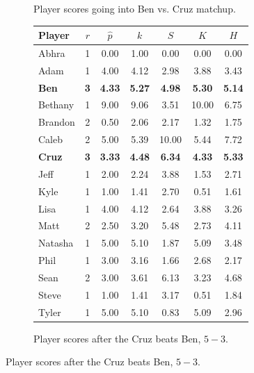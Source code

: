 \documentclass[letterpaper, 10 pt, conference]{ieeeconf}  %
\begin{document}
\begin{figure}[h!b]
\begin{subfigure}[hb]{0.4\textwidth}
\begin{tabular}{lccc|ccc}
                        \bottomrule
                \end{tabular}
                \caption{Player scores going into Ben vs. Cruz matchup.}
        \end{subfigure}
        \begin{subfigure}[hb]{0.4\textwidth}
                \footnotesize
                \centering
                \begin{tabular}{lccc|ccc}
                        \toprule
                        Player	&	$r$	&	$\hat{p}$	&	$k$	&	$S$	&	$K$	&	$H$	\\
                        \midrule													
                        Abhra	&	1	&	0.00	&	1.00	&	0.00	&	0.00	&	0.00	\\
                        Adam	&	1	&	4.00	&	4.12	&	2.98	&	3.88	&	3.43	\\
                        \textbf{Ben}	&	\textbf{3}	&	\textbf{4.33}	&	\textbf{5.27}	&	\textbf{4.98}	&	\textbf{5.30}	&	\textbf{5.14}	\\
                        Bethany	&	1	&	9.00	&	9.06	&	3.51	&	10.00	&	6.75	\\
                        Brandon	&	2	&	0.50	&	2.06	&	2.17	&	1.32	&	1.75	\\
                        Caleb	&	2	&	5.00	&	5.39	&	10.00	&	5.44	&	7.72	\\
                        \textbf{Cruz}	&	\textbf{3}	&	\textbf{3.33}	&	\textbf{4.48}	&	\textbf{6.34}	&	\textbf{4.33}	&	\textbf{5.33}	\\
                        Jeff	&	1	&	2.00	&	2.24	&	3.88	&	1.53	&	2.71	\\
                        Kyle	&	1	&	1.00	&	1.41	&	2.70	&	0.51	&	1.61	\\
                        Lisa	&	1	&	4.00	&	4.12	&	2.64	&	3.88	&	3.26	\\
                        Matt	&	2	&	2.50	&	3.20	&	5.48	&	2.73	&	4.11	\\
                        Natasha	&	1	&	5.00	&	5.10	&	1.87	&	5.09	&	3.48	\\
                        Phil	&	1	&	3.00	&	3.16	&	1.66	&	2.68	&	2.17	\\
                        Sean	&	2	&	3.00	&	3.61	&	6.13	&	3.23	&	4.68	\\
                        Steve	&	1	&	1.00	&	1.41	&	3.17	&	0.51	&	1.84	\\
                        Tyler	&	1	&	5.00	&	5.10	&	0.83	&	5.09	&	2.96	\\
                        \bottomrule
                \end{tabular}
                \caption{Player scores after the Cruz beats Ben, $5-3$.}
        \end{subfigure}


\end{figure}
\end{document}
